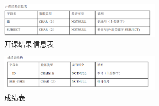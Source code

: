 \begin{figure}[H] %
    \centering %
    \includegraphics[width=0.7\textwidth]{选区_009} %
    \caption{开课结果信息表} %
    \label{Fig.main2} %
\end{figure}

\begin{figure}[H] %
    \centering %
    \includegraphics[width=0.7\textwidth]{选区_010} %
    \caption{成绩表} %
    \label{Fig.main2} %
\end{figure}
